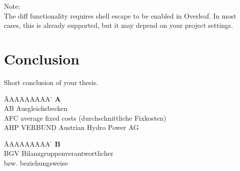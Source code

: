\documentclass[a4paper, fleqn, headsepline, footsepline, 12pt, parskip=half]{scrartcl}
\begin{document}
Note:\\
The diff functionality requires shell escape to be enabled in Overleaf. In most cases, this is already supported, but it may depend on your project settings.


\newpage
\section{Conclusion}
\label{sec:conclusion}

Short conclusion of your thesis.



\newpage
\pagestyle{myheadings}
\pagestyle{headings}



\begin{tabbing}
	\hspace{0.0cm}  \= AAAAAAAAA \=       \hspace{2cm} \kill
	\> \textbf{A} 	\> \\
	\> AB			\> Ausgleichsbecken\\
	\> AFC     		\> average fixed costs (durchschnittliche Fixkosten)\\
	\> AHP 			\> VERBUND Austrian Hydro Power AG\\
\end{tabbing} 

\vspace*{-1.5cm}
\begin{tabbing}
	\hspace{0.0cm}  \= AAAAAAAAA \=       \hspace{2cm} \kill
	\> \textbf{B} 	\> \\
	\> BGV 			\> Bilanzgruppenverantwortlicher\\
	\> bzw. 		\> beziehungsweise\\
\end{tabbing}
\end{document}
